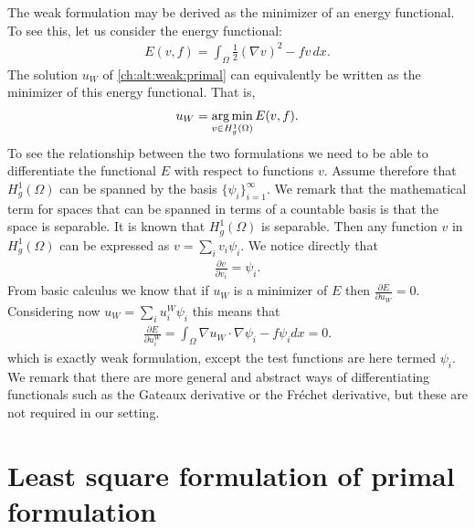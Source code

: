 The weak formulation may be derived as the minimizer of an energy functional. To see this, let us  
consider the energy functional: 
\begin{align}
E (v, f) = \int_\Omega \frac{1}{2} (\nabla v)^2  - f v \, dx.   
\end{align}
The solution $u_W$ of \eqref{ch:alt:weak:primal} can equivalently be written as the minimizer of this energy functional. That is, 
\begin{align}
u_W = \operatorname*{arg\,min}_{v \in H^1_g(\Omega) } E (v, f) .   
\end{align}
To see the relationship between the two formulations we need to be able to differentiate the functional $E$ with respect 
to functions $v$. Assume therefore that $H^1_g(\Omega)$ can be spanned by the basis $\{\psi_i\}^\infty_{i=1}$.
We remark that the mathematical term for spaces that can be spanned in terms of a countable basis is that 
the space is separable. It is known that $H^1_g(\Omega)$ is separable. Then 
any function $v$ in $H^1_g(\Omega)$ can be expressed as $v=\sum_i v_i \psi_i$.  We notice directly that
\begin{align} 
\frac{\partial v }{\partial v_i } = \psi_i .  
\end{align} 
From basic calculus we know that
if $u_W$ is a minimizer of $E$ then   $\frac{\partial E}{\partial u_W} = 0 $.
Considering now  $u_W=\sum_i u^W_i \psi_i$ this means that   
\begin{align} 
\frac{\partial E }{\partial u^W_i } = \int_\Omega \nabla u_W \cdot \nabla \psi_i - f \psi_i dx  = 0 .    
\end{align} 
which is exactly weak formulation, except the test functions are here termed $\psi_i$. 
We remark that there are more general and abstract ways of 
differentiating functionals such as the 
Gateaux derivative or the Fréchet derivative,  but these are not required in our setting. 

\section{Least square formulation of primal formulation}

